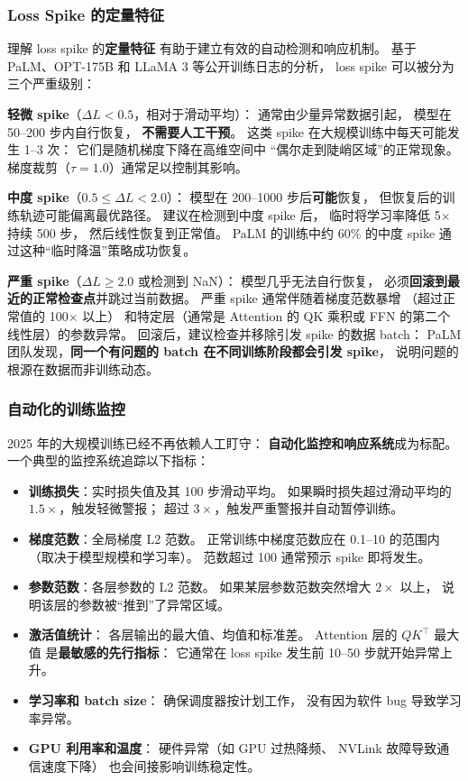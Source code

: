 \subsubsection{Loss Spike 的定量特征}

理解 loss spike 的\textbf{定量特征}
有助于建立有效的自动检测和响应机制。
基于 PaLM、OPT-175B 和 LLaMA 3 等公开训练日志的分析，
loss spike 可以被分为三个严重级别：

\textbf{轻微 spike}（$\Delta L < 0.5$，相对于滑动平均）：
通常由少量异常数据引起，
模型在 50--200 步内自行恢复，
\textbf{不需要人工干预}。
这类 spike 在大规模训练中每天可能发生 1--3 次：
它们是随机梯度下降在高维空间中
“偶尔走到陡峭区域”的正常现象。
梯度裁剪（$\tau = 1.0$）通常足以控制其影响。

\textbf{中度 spike}（$0.5 \leq \Delta L < 2.0$）：
模型在 200--1000 步后\textbf{可能}恢复，
但恢复后的训练轨迹可能偏离最优路径。
建议在检测到中度 spike 后，
临时将学习率降低 5$\times$ 持续 500 步，
然后线性恢复到正常值。
PaLM 的训练中约 60\% 的中度 spike
通过这种“临时降温”策略成功恢复。

\textbf{严重 spike}（$\Delta L \geq 2.0$ 或检测到 NaN）：
模型几乎无法自行恢复，
必须\textbf{回滚到最近的正常检查点}并跳过当前数据。
严重 spike 通常伴随着梯度范数暴增
（超过正常值的 100$\times$ 以上）
和特定层（通常是 Attention 的 QK 乘积或
FFN 的第二个线性层）的参数异常。
回滚后，建议检查并移除引发 spike 的数据 batch：
PaLM 团队发现，\textbf{同一个有问题的 batch
在不同训练阶段都会引发 spike}，
说明问题的根源在数据而非训练动态。

\subsubsection{自动化的训练监控}

2025 年的大规模训练已经不再依赖人工盯守：
\textbf{自动化监控和响应系统}成为标配。
一个典型的监控系统追踪以下指标：

\begin{itemize}[noitemsep]
  \item \textbf{训练损失}：实时损失值及其 100 步滑动平均。
        如果瞬时损失超过滑动平均的 $1.5\times$，触发轻微警报；
        超过 $3\times$，触发严重警报并自动暂停训练。
  \item \textbf{梯度范数}：全局梯度 L2 范数。
        正常训练中梯度范数应在 0.1--10 的范围内
        （取决于模型规模和学习率）。
        范数超过 100 通常预示 spike 即将发生。
  \item \textbf{参数范数}：各层参数的 L2 范数。
        如果某层参数范数突然增大 $2\times$ 以上，
        说明该层的参数被“推到”了异常区域。
  \item \textbf{激活值统计}：
        各层输出的最大值、均值和标准差。
        Attention 层的 $QK^\top$ 最大值
        是\textbf{最敏感的先行指标}：
        它通常在 loss spike 发生前 10--50 步就开始异常上升。
  \item \textbf{学习率和 batch size}：
        确保调度器按计划工作，
        没有因为软件 bug 导致学习率异常。
  \item \textbf{GPU 利用率和温度}：
        硬件异常（如 GPU 过热降频、
        NVLink 故障导致通信速度下降）
        也会间接影响训练稳定性。
\end{itemize}

